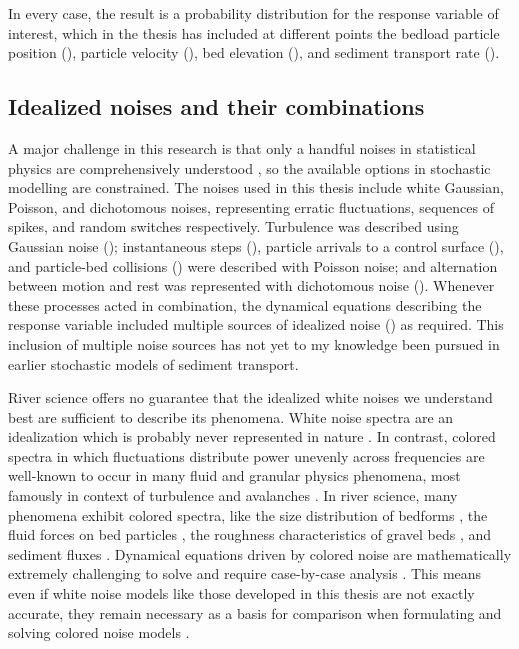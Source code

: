 In every case, the result is a probability distribution for the response variable of interest, which in the thesis has included at different points the bedload particle position (), particle velocity (), bed elevation (), and sediment transport rate ().

\subsection{Idealized noises and their combinations}

A major challenge in this research is that only a handful noises in statistical physics are comprehensively understood \citep{}, so the available options in stochastic modelling are constrained.
The noises used in this thesis include white Gaussian, Poisson, and dichotomous noises, representing erratic fluctuations, sequences of spikes, and random switches respectively. 
Turbulence was described using Gaussian noise (); instantaneous steps (), particle arrivals to a control surface (), and particle-bed collisions () were described with Poisson noise; and alternation between motion and rest was represented with dichotomous noise ().
Whenever these processes acted in combination, the dynamical equations describing the response variable included multiple sources of idealized noise () as required.
This inclusion of multiple noise sources has not yet to my knowledge been pursued in earlier stochastic models of sediment transport.

River science offers no guarantee that the idealized white noises we understand best are sufficient to describe its phenomena.
White noise spectra are an idealization which is probably never represented in nature \citep{Gardiner1983}.
In contrast, colored spectra in which fluctuations distribute power unevenly across frequencies are well-known to occur in many fluid and granular physics phenomena, most famously in context of turbulence \citep{Kolmogorov1941,Nikora2000} and avalanches \citep{Bak1987,Jensen1998}.
In river science, many phenomena exhibit colored spectra, like the size distribution of bedforms \citep{Nikora1997,Guala2014}, the fluid forces on bed particles \citep{Dwivedi2011, Amir2014}, the roughness characteristics of gravel beds \citep{Aberle2006,Singh2012}, and sediment fluxes \citep{Dhont2018,Chartrand2021}.
Dynamical equations driven by colored noise are mathematically extremely challenging to solve and require case-by-case analysis \citep{Hanggi1978,Luczka2005,Hanggi2007}.
This means even if white noise models like those developed in this thesis are not exactly accurate, they remain necessary as a basis for comparison when formulating and solving colored noise models \citep{Fox1986,Moss1989}.


